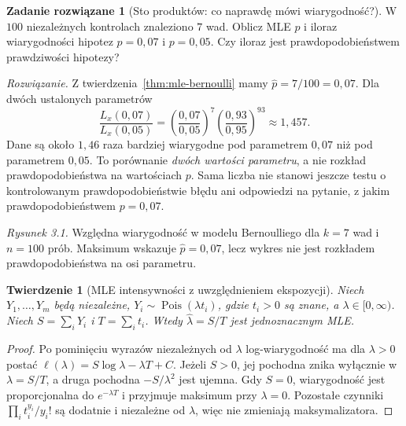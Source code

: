 \documentclass[11pt,a4paper,oneside]{report}
\numberwithin{equation}{chapter}
\theoremstyle{plain}
\newtheorem{twierdzenie}{Twierdzenie}[chapter]
\theoremstyle{definition}
\newtheorem{zadanie}{Zadanie rozwiązane}[chapter]
\theoremstyle{remark}
\DeclareMathOperator{\Pois}{Pois}
\begin{document}
\begin{zadanie}[Sto produktów: co naprawdę mówi wiarygodność?]\label{zad:lik-quality}
W $100$ niezależnych kontrolach znaleziono $7$ wad. Oblicz MLE $p$ i iloraz
wiarygodności hipotez $p=0{,}07$ i $p=0{,}05$. Czy iloraz jest prawdopodobieństwem
prawdziwości hipotezy?
\par\emph{Rozwiązanie.} Z twierdzenia~\ref{thm:mle-bernoulli} mamy
$\widehat p=7/100=0{,}07$. Dla dwóch ustalonych parametrów
\[
\frac{L_x(0{,}07)}{L_x(0{,}05)}
=\left(\frac{0{,}07}{0{,}05}\right)^7
 \left(\frac{0{,}93}{0{,}95}\right)^{93}
\approx1{,}457.
\]
Dane są około $1{,}46$ raza bardziej wiarygodne pod parametrem $0{,}07$
niż pod parametrem $0{,}05$. To porównanie \emph{dwóch wartości parametru},
a nie rozkład prawdopodobieństwa na wartościach $p$. Sama liczba nie
stanowi jeszcze testu o kontrolowanym prawdopodobieństwie błędu ani
odpowiedzi na pytanie, z jakim prawdopodobieństwem $p=0{,}07$.
\end{zadanie}

\begin{center}
\end{center}
\noindent\emph{Rysunek 3.1.} Względna wiarygodność w modelu
Bernoulliego dla $k=7$ wad i $n=100$ prób. Maksimum wskazuje
$\widehat p=0{,}07$, lecz wykres nie jest rozkładem prawdopodobieństwa
na osi parametru.


\begin{twierdzenie}[MLE intensywności z uwzględnieniem ekspozycji]\label{thm:mle-pois}
Niech $Y_1,\ldots,Y_m$ będą niezależne, $Y_i\sim\Pois(\lambda t_i)$,
gdzie $t_i>0$ są znane, a $\lambda\in[0,\infty)$. Niech
$S=\sum_iY_i$ i $T=\sum_i t_i$. Wtedy
$\widehat\lambda=S/T$ jest jednoznacznym MLE.
\end{twierdzenie}
\begin{proof}
Po pominięciu wyrazów niezależnych od $\lambda$ log-wiarygodność ma dla
$\lambda>0$ postać $\ell(\lambda)=S\log\lambda-\lambda T+C$.
Jeżeli $S>0$, jej pochodna znika wyłącznie w $\lambda=S/T$, a druga
pochodna $-S/\lambda^2$ jest ujemna. Gdy $S=0$, wiarygodność jest
proporcjonalna do $e^{-\lambda T}$ i przyjmuje maksimum przy $\lambda=0$.
Pozostałe czynniki $\prod_i t_i^{y_i}/y_i!$ są dodatnie i niezależne
od $\lambda$, więc nie zmieniają maksymalizatora.
\end{proof}
\end{document}
